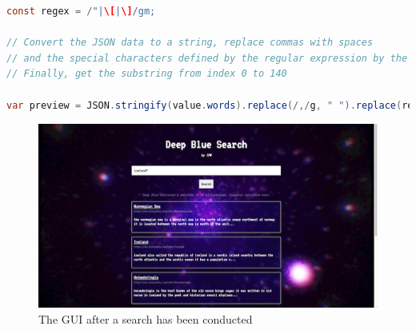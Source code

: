 \begin{lstlisting}[language=Java,
	caption={Preview generation},
	label={lst:preview}]
const regex = /"|\[|\]/gm;

// Convert the JSON data to a string, replace commas with spaces 
// and the special characters defined by the regular expression by the empty string. 
// Finally, get the substring from index 0 to 140

var preview = JSON.stringify(value.words).replace(/,/g, " ").replace(regex, "").substring(0, 140);
\end{lstlisting}

\begin{figure}[h]
	\centering
	\includegraphics[width=\textwidth]{graphics/gui.png}
	\caption{The GUI after a search has been conducted}
	\label{fig:gui:results}
\end{figure}